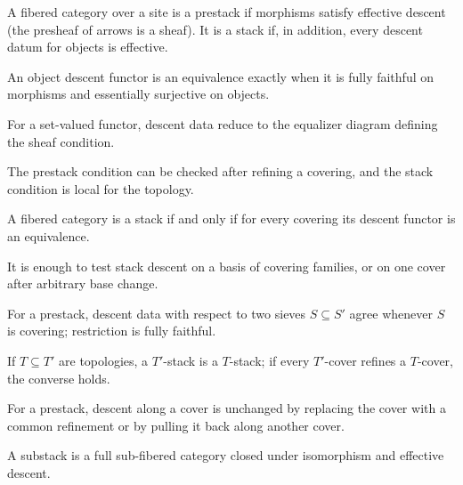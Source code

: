 \begin{definition}\label{fga-def-4-8}
A fibered category over a site is a prestack if morphisms satisfy effective
descent (the presheaf of arrows is a sheaf).  It is a stack if, in addition,
every descent datum for objects is effective.
\end{definition}
\begin{proposition}\label{fga-prop-4-7}
An object descent functor is an equivalence exactly when it is fully faithful on
morphisms and essentially surjective on objects.
\end{proposition}
\begin{proposition}\label{fga-prop-4-9}
For a set-valued functor, descent data reduce to the equalizer diagram defining
the sheaf condition.
\end{proposition}
\begin{proposition}\label{fga-prop-4-12}
The prestack condition can be checked after refining a covering, and the stack
condition is local for the topology.
\end{proposition}
\begin{corollary}\label{fga-cor-4-13}
A fibered category is a stack if and only if for every covering its descent
functor is an equivalence.
\end{corollary}
\begin{proposition}\label{fga-prop-4-14}
It is enough to test stack descent on a basis of covering families, or on one
cover after arbitrary base change.
\end{proposition}
\begin{lemma}\label{fga-lem-4-15}
For a prestack, descent data with respect to two sieves $S\subseteq S'$ agree
whenever $S$ is covering; restriction is fully faithful.
\end{lemma}
\begin{proposition}\label{fga-prop-4-16}
If $T\subseteq T'$ are topologies, a $T'$-stack is a $T$-stack; if every
$T'$-cover refines a $T$-cover, the converse holds.
\end{proposition}
\begin{lemma}\label{fga-lem-4-17}
For a prestack, descent along a cover is unchanged by replacing the cover with
a common refinement or by pulling it back along another cover.
\end{lemma}
\begin{definition}[substack]\label{fga-def-4-18}
A substack is a full sub-fibered category closed under isomorphism and effective
descent.
\end{definition}

